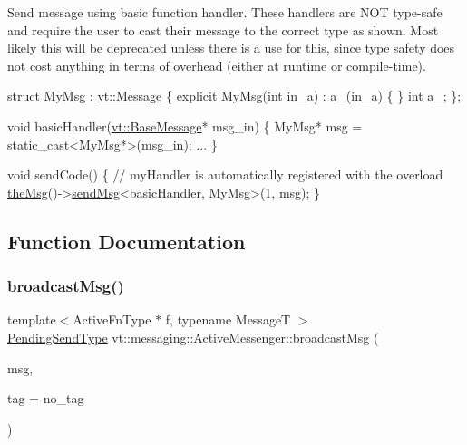 Send message using basic function handler. These handlers are N\+OT type-\/safe and require the user to cast their message to the correct type as shown. Most likely this will be deprecated unless there is a use for this, since type safety does not cost anything in terms of overhead (either at runtime or compile-\/time).


\begin{DoxyCode}
\textcolor{keyword}{struct }MyMsg : \hyperlink{structvt_1_1messaging_1_1_active_msg}{vt::Message} \{
  \textcolor{keyword}{explicit} MyMsg(\textcolor{keywordtype}{int} in\_a) : a\_(in\_a) \{ \}
  \textcolor{keywordtype}{int} a\_;
\};

\textcolor{keywordtype}{void} basicHandler(\hyperlink{structvt_1_1messaging_1_1_base_msg}{vt::BaseMessage}* msg\_in) \{
  MyMsg* msg = \textcolor{keyword}{static\_cast<}MyMsg*\textcolor{keyword}{>}(msg\_in);
  ...
\}

\textcolor{keywordtype}{void} sendCode() \{
  \textcolor{comment}{// myHandler is automatically registered with the overload}
  \hyperlink{namespacevt_aeafd31f866aeb4dc6fc2f6ee97136350}{theMsg}()->\hyperlink{group__preregister_gaebfcd932babb3be0ea8d481f655a2835}{sendMsg}<basicHandler, MyMsg>(1, msg);
\}
\end{DoxyCode}
 

\subsection{Function Documentation}
\mbox{\label{group__basicsend_gaadd12687ecb3f0e9be2ce62224568d77}} 
\subsubsection{\texorpdfstring{broadcast\+Msg()}{broadcastMsg()}}
{\footnotesize\ttfamily template$<$Active\+Fn\+Type $\ast$ f, typename MessageT $>$ \\
\hyperlink{structvt_1_1messaging_1_1_active_messenger_a3626a6ca76d8ad4ec7c3b47a2c70d3a8}{Pending\+Send\+Type} vt\+::messaging\+::\+Active\+Messenger\+::broadcast\+Msg (\begin{DoxyParamCaption}\item[{MessageT $\ast$}]{msg,  }\item[{\hyperlink{namespacevt_a84ab281dae04a52a4b243d6bf62d0e52}{Tag\+Type}}]{tag = {\ttfamily no\+\_\+tag} }\end{DoxyParamCaption})}



